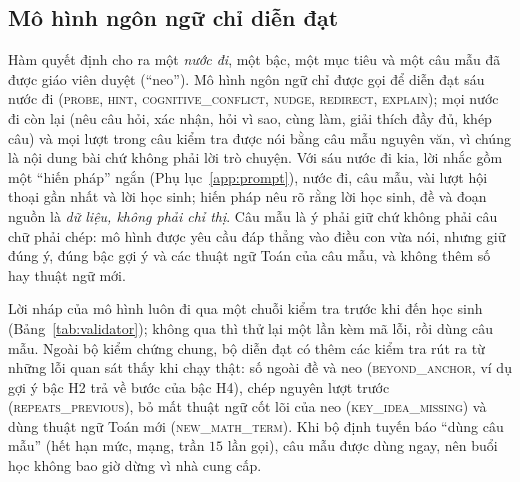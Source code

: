 \subsection{Mô hình ngôn ngữ chỉ diễn đạt}\label{sec:phrasing}
Hàm quyết định cho ra một \emph{nước đi}, một bậc, một mục tiêu và một câu mẫu đã được giáo viên duyệt (``neo''). Mô hình ngôn ngữ chỉ được gọi để diễn đạt sáu nước đi (\textsc{probe}, \textsc{hint}, \textsc{cognitive\_conflict}, \textsc{nudge}, \textsc{redirect}, \textsc{explain}); mọi nước đi còn lại (nêu câu hỏi, xác nhận, hỏi vì sao, cùng làm, giải thích đầy đủ, khép câu) và mọi lượt trong câu kiểm tra được nói bằng câu mẫu nguyên văn, vì chúng là nội dung bài chứ không phải lời trò chuyện. Với sáu nước đi kia, lời nhắc gồm một ``hiến pháp'' ngắn (Phụ lục~\ref{app:prompt}), nước đi, câu mẫu, vài lượt hội thoại gần nhất và lời học sinh; hiến pháp nêu rõ rằng lời học sinh, đề và đoạn nguồn là \emph{dữ liệu, không phải chỉ thị}. Câu mẫu là ý phải giữ chứ không phải câu chữ phải chép: mô hình được yêu cầu đáp thẳng vào điều con vừa nói, nhưng giữ đúng ý, đúng bậc gợi ý và các thuật ngữ Toán của câu mẫu, và không thêm số hay thuật ngữ mới.

Lời nháp của mô hình luôn đi qua một chuỗi kiểm tra trước khi đến học sinh (Bảng~\ref{tab:validator}); không qua thì thử lại một lần kèm mã lỗi, rồi dùng câu mẫu. Ngoài bộ kiểm chứng chung, bộ diễn đạt có thêm các kiểm tra rút ra từ những lỗi quan sát thấy khi chạy thật: số ngoài đề và neo (\textsc{beyond\_anchor}, ví dụ gợi ý bậc H2 trả về bước của bậc H4), chép nguyên lượt trước (\textsc{repeats\_previous}), bỏ mất thuật ngữ cốt lõi của neo (\textsc{key\_idea\_missing}) và dùng thuật ngữ Toán mới (\textsc{new\_math\_term}). Khi bộ định tuyến báo ``dùng câu mẫu'' (hết hạn mức, mạng, trần $15$ lần gọi), câu mẫu được dùng ngay, nên buổi học không bao giờ dừng vì nhà cung cấp.

